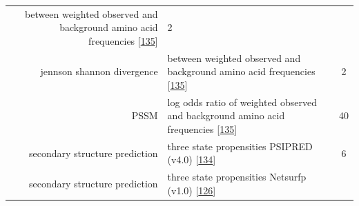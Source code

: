 \documentclass[12pt,a4paper,twoside]{book}
\theoremstyle{definition}
\theoremstyle{definition}
\theoremstyle{remark}
\begin{document}
\begin{longtable}[]{@{}rlc@{}}
\begin{minipage}[t]{0.50\columnwidth}
between weighted observed and background amino acid frequencies
{[}\protect\hyperlink{ref-Robinson1991}{135}{]}\strut
\end{minipage} & \begin{minipage}[t]{0.18\columnwidth}\centering\strut
2\strut
\end{minipage}\tabularnewline
\begin{minipage}[t]{0.23\columnwidth}\raggedleft\strut
jennson shannon divergence\strut
\end{minipage} & \begin{minipage}[t]{0.50\columnwidth}\raggedright\strut
between weighted observed and background amino acid frequencies
{[}\protect\hyperlink{ref-Robinson1991}{135}{]}\strut
\end{minipage} & \begin{minipage}[t]{0.18\columnwidth}\centering\strut
2\strut
\end{minipage}\tabularnewline
\begin{minipage}[t]{0.23\columnwidth}\raggedleft\strut
PSSM\strut
\end{minipage} & \begin{minipage}[t]{0.50\columnwidth}\raggedright\strut
log odds ratio of weighted observed and background amino acid
frequencies {[}\protect\hyperlink{ref-Robinson1991}{135}{]}\strut
\end{minipage} & \begin{minipage}[t]{0.18\columnwidth}\centering\strut
40\strut
\end{minipage}\tabularnewline
\begin{minipage}[t]{0.23\columnwidth}\raggedleft\strut
secondary structure prediction\strut
\end{minipage} & \begin{minipage}[t]{0.50\columnwidth}\raggedright\strut
three state propensities PSIPRED (v4.0)
{[}\protect\hyperlink{ref-Jones1999}{134}{]}\strut
\end{minipage} & \begin{minipage}[t]{0.18\columnwidth}\centering\strut
6\strut
\end{minipage}\tabularnewline
\begin{minipage}[t]{0.23\columnwidth}\raggedleft\strut
secondary structure prediction\strut
\end{minipage} & \begin{minipage}[t]{0.50\columnwidth}\raggedright\strut
three state propensities Netsurfp (v1.0)
{[}\protect\hyperlink{ref-Petersen2009a}{126}{]}\strut
\end{minipage} & \begin{minipage}[t]{0.18\columnwidth}\centering\strut

\end{minipage}
\end{longtable}
\end{document}

